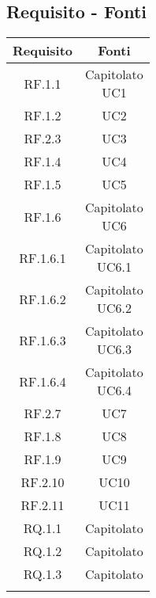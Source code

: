 \subsection{Requisito - Fonti}
\begin{table}[H]
  \centering
  \begin{tabular}{|c|c|}
    \hline
    \rowcolor[HTML]{036400}
    {\color[HTML]{FFFFFF} Requisito} & {\color[HTML]{FFFFFF} Fonti} \\ \hline
    \rowcolor[HTML]{EFEFEF}
    RF.1.1 & \req{Capitolato \\ UC1} \\ \hline
    \rowcolor[HTML]{C0C0C0}
    RF.1.2 & UC2 \\ \hline
    \rowcolor[HTML]{EFEFEF}
    RF.2.3 & UC3 \\ \hline
    \rowcolor[HTML]{C0C0C0}
    RF.1.4 & UC4 \\ \hline
    \rowcolor[HTML]{EFEFEF}
    RF.1.5 & UC5 \\ \hline
    \rowcolor[HTML]{C0C0C0}
    RF.1.6 & \req{Capitolato \\ UC6} \\ \hline
    \rowcolor[HTML]{EFEFEF}
    RF.1.6.1 & \req{Capitolato \\ UC6.1} \\ \hline
    \rowcolor[HTML]{C0C0C0}
    RF.1.6.2 & \req{Capitolato \\ UC6.2} \\ \hline
    \rowcolor[HTML]{EFEFEF}
    RF.1.6.3 & \req{Capitolato \\ UC6.3} \\ \hline
    \rowcolor[HTML]{C0C0C0}
    RF.1.6.4 & \req{Capitolato \\ UC6.4} \\ \hline
    \rowcolor[HTML]{EFEFEF}
    RF.2.7 & UC7 \\ \hline
    \rowcolor[HTML]{C0C0C0}
    RF.1.8 & UC8 \\ \hline
    \rowcolor[HTML]{EFEFEF}
    RF.1.9 & UC9 \\ \hline
    \rowcolor[HTML]{C0C0C0}
    RF.2.10 & UC10 \\ \hline
    \rowcolor[HTML]{EFEFEF}
    RF.2.11 & UC11 \\ \hline
    \rowcolor[HTML]{C0C0C0}
    RQ.1.1 & Capitolato \\ \hline
    \rowcolor[HTML]{EFEFEF}
    RQ.1.2 & Capitolato \\ \hline
    \rowcolor[HTML]{C0C0C0}
    RQ.1.3 & Capitolato \\ \hline
    \rowcolor[HTML]{EFEFEF}

\end{tabular}
\end{table}
